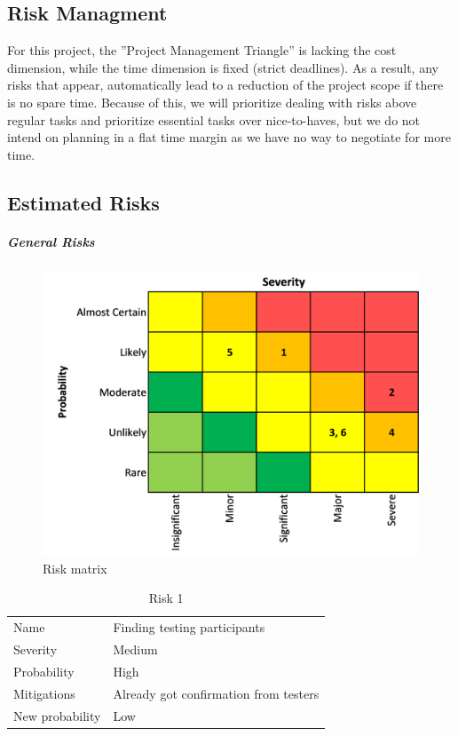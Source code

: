 \subsection{Risk Managment}
For this project, the ”Project Management Triangle” is lacking the cost dimension, while the time dimension is fixed (strict deadlines). As a result, any risks that appear, automatically lead to a reduction of the project scope if there is no spare time. Because of this, we will prioritize dealing with risks above regular tasks and prioritize essential tasks over nice-to-haves, but we do not intend on planning in a flat time margin as we have no way to negotiate for more time.

\subsection{Estimated Risks}

\subparagraph{General Risks}

\begin{figure}[H]
  \includegraphics[width=\linewidth]{resources/risks-matrix.png}
  \caption{Risk matrix}
  \label{risk_matrix}
\end{figure}

\begin{table}
  \centering
  \begin{tabular}{ll}
    Name            & Finding testing participants           \\
    Severity        & Medium                                 \\
    Probability     & High                                   \\
    Mitigations     & Already got confirmation from testers  \\
    New probability & Low                                   
  \end{tabular}
  \caption{Risk 1}
\end{table}

